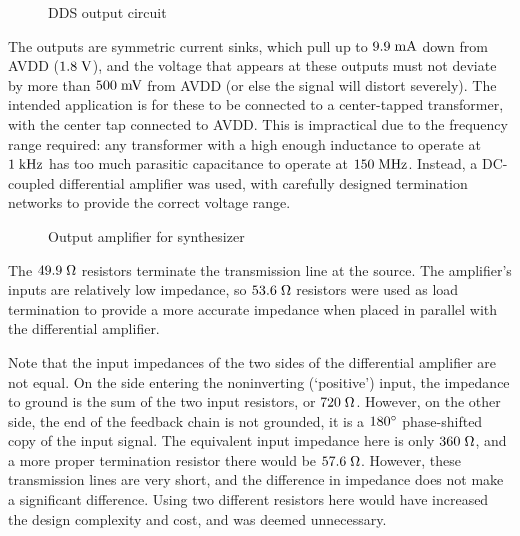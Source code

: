 \begin{figure}[H]
\centering
{}
\caption{DDS output circuit}
\label{fig:ddsoutput}
\end{figure}

The outputs are symmetric current sinks, which pull up to $9.9\;\mathrm{mA}$
down from AVDD ($1.8\;\mathrm{V}$), and the voltage that appears at these
outputs must not deviate by more than $500\;\mathrm{mV}$ from AVDD (or else
the signal will distort severely). The intended application is for these
to be connected to a center-tapped transformer, with the center tap connected
to AVDD. This is impractical due to the frequency range required: any
transformer with a high enough inductance to operate at $1\;\mathrm{kHz}$ has
too much parasitic capacitance to operate at $150\;\mathrm{MHz}$. Instead,
a DC-coupled differential amplifier was used, with carefully designed
termination networks to provide the correct voltage range.

\begin{figure}[H]
\centering
{}
\caption{Output amplifier for synthesizer}
\label{fig:synthoutput}
\end{figure}

The $49.9\;\mathrm{\Omega}$ resistors terminate the transmission line at the
source. The amplifier's inputs are relatively low impedance, so $53.6\;\mathrm{\Omega}$
resistors were used as load termination to provide a more accurate impedance when
placed in parallel with the differential amplifier.

Note that the input impedances of the two sides of the differential amplifier
are not equal. On the side entering the noninverting (`positive') input, the
impedance to ground is the sum of the two input resistors, or $720\;\mathrm{\Omega}$.
However, on the other side, the end of the feedback chain is not grounded, it is
a $180{}^\circ$ phase-shifted copy of the input signal. The equivalent input impedance
here is only $360\;\mathrm{\Omega}$, and a more proper termination resistor there
would be $57.6\;\mathrm{\Omega}$. However, these transmission lines are very short,
and the difference in impedance does not make a significant difference. Using
two different resistors here would have increased the design complexity and cost,
and was deemed unnecessary. 
